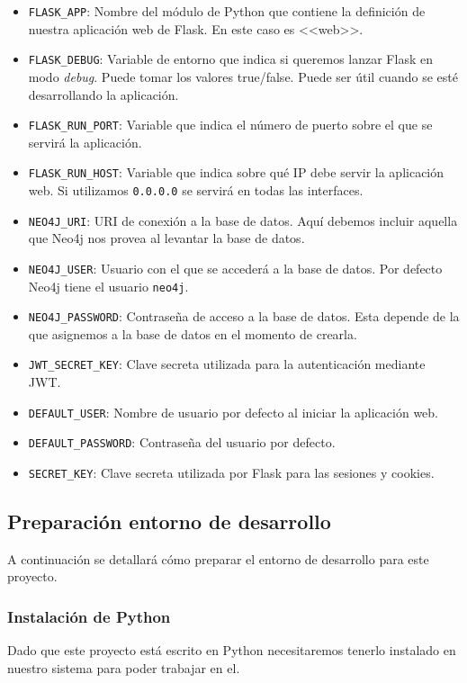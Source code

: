 \begin{itemize}
	\item \texttt{FLASK\_APP}: Nombre del módulo de Python que contiene la definición de nuestra aplicación web de Flask. En este caso es <<web>>.
	\item \texttt{FLASK\_DEBUG}: Variable de entorno que indica si queremos lanzar Flask en modo \textit{debug}. Puede tomar los valores true/false. Puede ser útil cuando se esté desarrollando la aplicación.
	\item \texttt{FLASK\_RUN\_PORT}: Variable que indica el número de puerto sobre el que se servirá la aplicación.
	\item \texttt{FLASK\_RUN\_HOST}: Variable que indica sobre qué IP debe servir la aplicación web. Si utilizamos \texttt{0.0.0.0} se servirá en todas las interfaces.
	\item \texttt{NEO4J\_URI}: URI de conexión a la base de datos. Aquí debemos incluir aquella que Neo4j nos provea al levantar la base de datos.
	\item \texttt{NEO4J\_USER}: Usuario con el que se accederá a la base de datos. Por defecto Neo4j tiene el usuario \texttt{neo4j}.
	\item \texttt{NEO4J\_PASSWORD}: Contraseña de acceso a la base de datos. Esta depende de la que asignemos a la base de datos en el momento de crearla.
	\item \texttt{JWT\_SECRET\_KEY}: Clave secreta utilizada para la autenticación mediante JWT.
	\item \texttt{DEFAULT\_USER}: Nombre de usuario por defecto al iniciar la aplicación web.
	\item \texttt{DEFAULT\_PASSWORD}: Contraseña del usuario por defecto.
	\item \texttt{SECRET\_KEY}: Clave secreta utilizada por Flask para las sesiones y cookies.
\end{itemize}

\subsection{Preparación entorno de desarrollo}
A continuación se detallará cómo preparar el entorno de desarrollo para este proyecto.
\subsubsection{Instalación de Python}
Dado que este proyecto está escrito en Python necesitaremos tenerlo instalado en nuestro sistema para poder trabajar en el.

